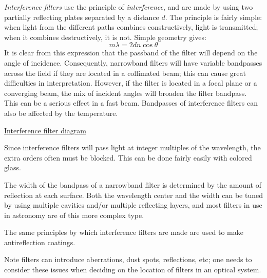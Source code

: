 \documentclass[12pt]{article}
\begin{document}
\emph{Interference filters} use the principle of \emph{interference},
and are made by using two
partially reflecting plates separated by a distance $d$.
The principle is fairly simple:
when light from the different paths
combines constructively, light is transmitted; when it combines
destructively, it is not. Simple geometry gives:{$$
    m\lambda = 2dn\cos\theta
$$}It is clear from this expression that the passband of the filter will
depend on the angle of incidence. Consequently, narrowband filters will
have variable bandpasses across the field if they are located in a
collimated beam; this can cause great difficulties in interpretation.
However, if the filter is located in a focal plane or a converging beam,
the mix of incident angles will broaden the filter bandpass.
This can be a serious effect in a fast beam. Bandpasses of
interference filters can also be affected by the temperature.
\par\href{http://astronomy.nmsu.edu/holtz/a535/html/diagrams/a535/intfilt.htm}
{Interference filter diagram}

Since interference filters will pass light at integer multiples of the
wavelength, the extra orders often must be blocked. This can be done
fairly easily with colored glass.

The width of the bandpass of a narrowband filter is determined by the
amount of reflection at each surface. Both the wavelength center and
the width can be tuned by using multiple cavities and/or multiple
reflecting layers, and most filters in use in astronomy are of this
more complex type.

The same principles by which interference filters are made are used to
make antireflection coatings.

Note filters can introduce aberrations, dust spots, reflections, etc;
one needs to consider these issues when deciding on the location of
filters in an optical system.
\end{document}
